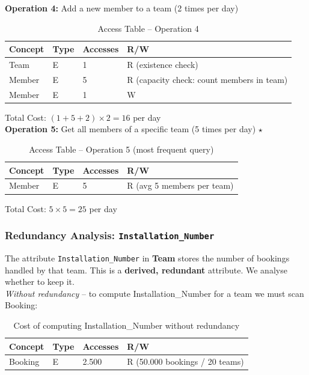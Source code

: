 \noindent\textbf{Operation 4:} Add a new member to a team (2 times per day)
\begin{table}[H]
    \renewcommand{\arraystretch}{1.3}
    \begin{tabularx}{\textwidth}{|X|X|X|X|}
    \hline
    \textbf{Concept} & \textbf{Type} & \textbf{Accesses} & \textbf{R/W} \\ \hline
    Team   & E & 1    & R (existence check) \\ \hline
    Member & E & 5    & R (capacity check: count members in team) \\ \hline
    Member & E & 1    & W \\ \hline
    \end{tabularx}
    \caption{Access Table -- Operation 4}
\end{table}
\noindent Total Cost: $(1 + 5 + 2) \times 2 = 16$ per day\\

\noindent\textbf{Operation 5:} Get all members of a specific team (5 times per day) $\star$
\begin{table}[H]
    \renewcommand{\arraystretch}{1.3}
    \begin{tabularx}{\textwidth}{|X|X|X|X|}
    \hline
    \textbf{Concept} & \textbf{Type} & \textbf{Accesses} & \textbf{R/W} \\ \hline
    Member & E & 5 & R (avg 5 members per team) \\ \hline
    \end{tabularx}
    \caption{Access Table -- Operation 5 (most frequent query)}
\end{table}
\noindent Total Cost: $5 \times 5 = 25$ per day\\

\subsubsection{Redundancy Analysis: \texttt{Installation\_Number}}

\noindent The attribute \texttt{Installation\_Number} in \textbf{Team} stores the number of bookings handled
by that team. This is a \textbf{derived, redundant} attribute. We analyse whether to keep it.\\

\noindent\textit{Without redundancy} -- to compute Installation\_Number for a team we must scan Booking:
\begin{table}[H]
    \renewcommand{\arraystretch}{1.3}
    \begin{tabularx}{\textwidth}{|X|X|X|X|}
    \hline
    \textbf{Concept} & \textbf{Type} & \textbf{Accesses} & \textbf{R/W} \\ \hline
    Booking & E & 2.500 & R (50.000 bookings / 20 teams) \\ \hline
    \end{tabularx}
    \caption{Cost of computing Installation\_Number without redundancy}
\end{table}

